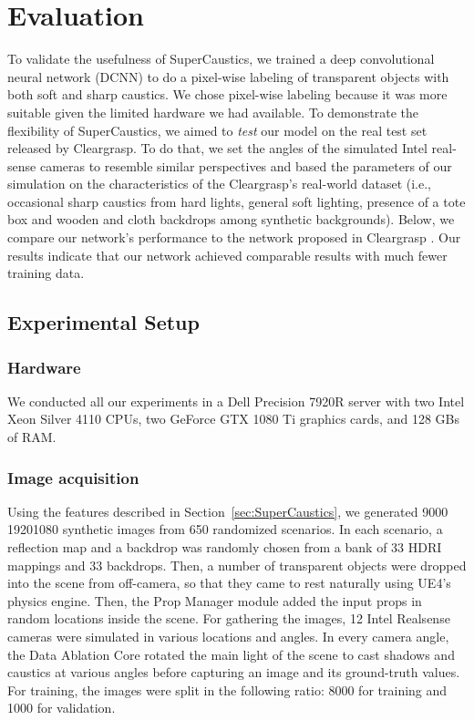 \documentclass[conference]{IEEEtran}
\begin{document}
\section{Evaluation}
To validate the usefulness of SuperCaustics, we trained a deep convolutional neural network (DCNN) to do a pixel-wise labeling of transparent objects with both soft and sharp caustics. We chose pixel-wise labeling because it was more suitable given the limited hardware we had available. To demonstrate the flexibility of SuperCaustics, we aimed to \textit{test} our model on the real test set released by Cleargrasp. To do that, we set the angles of the simulated Intel real-sense cameras to resemble similar perspectives and based the parameters of our simulation on the characteristics of the Cleargrasp's real-world dataset (i.e., occasional sharp caustics from hard lights, general soft lighting, presence of a tote box and wooden and cloth backdrops among synthetic backgrounds). Below, we compare our network's performance to the network proposed in Cleargrasp \cite{cleargrasp}. Our results indicate that our network achieved comparable results with much fewer training data.



\subsection{Experimental Setup}

\subsubsection{Hardware} We conducted all our experiments in a Dell Precision 7920R server with  two  Intel  Xeon  Silver  4110  CPUs,  two  GeForce  GTX  1080  Ti  graphics cards, and 128 GBs of RAM.

\subsubsection{Image acquisition} Using the features described in Section~\ref{sec:SuperCaustics}, we generated 9000 19201080 synthetic images from 650 randomized scenarios. In each scenario, a reflection map and a backdrop was randomly chosen from a bank of 33 HDRI mappings and 33 backdrops. Then, a number of transparent objects were dropped into the scene from off-camera, so that they came to rest naturally using UE4's physics engine. Then, the Prop Manager module added the input props in random locations inside the scene. For gathering the images, 12 Intel Realsense cameras were simulated in various locations and angles. In every camera angle, the Data Ablation Core rotated the main light of the scene to cast shadows and caustics at various angles before capturing an image and its ground-truth values. For training, the images were split in the following ratio: 8000 for training and 1000 for validation.
\end{document}
